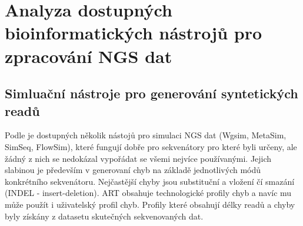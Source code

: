 \documentclass[czech,DP]{thesiskiv}
\numberwithin{equation}{section}
\begin{document}
\chapter{Analyza dostupných bioinformatických nástrojů pro zpracování NGS dat}


\section{Simluační nástroje pro generování syntetických readů}
Podle \cite{art} je dostupných několik nástojů pro simulaci NGS dat (Wgsim, MetaSim, SimSeq, FlowSim), které fungují dobře pro sekvenátory pro které byli určeny, ale žádný z nich se nedokázal vypořádat se všemi nejvíce používanými. Jejich slabinou je především v generovaní chyb na základě jednotlivých módů konkrétního sekvenátoru. Nejčastější chyby jsou substituční a vložení čí smazání (INDEL - insert-deletion). ART obsahuje technologické profily chyb a navíc mu může použít i uživatelský profil chyb. Profily které obsahují délky readů a chyby byly získány z datasetu skutečných sekvenovaných dat. 
\end{document}
